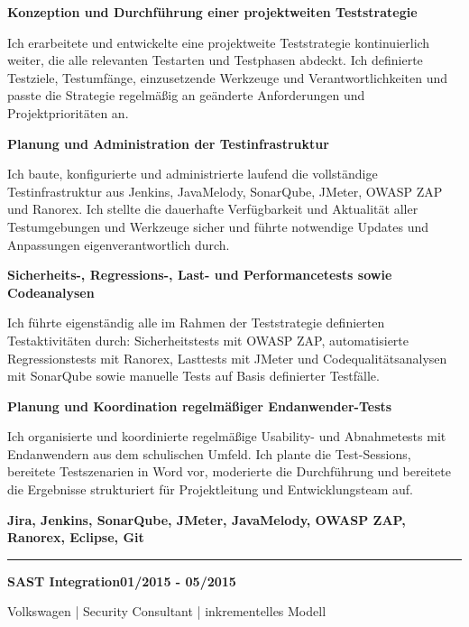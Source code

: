 \documentclass[9pt,a4paper]{article}
\newcommand{\phprojectname}[1]{{\fontsize{8.5}{9.2}\selectfont\bfseries #1}}
\newcommand{\phperiod}[1]{{\color{accent}\fontsize{6.5}{7}\selectfont\bfseries\MakeUppercase{#1}}}
\newcommand{\phprojectmeta}[1]{{\color{mutedfg}\fontsize{7}{8}\selectfont #1\par}}
\newcommand{\phresptitle}[1]{{\fontsize{7.5}{8.4}\selectfont\bfseries #1\par}}
\newcommand{\phrespdesc}[1]{{\color{mutedfg}\fontsize{7}{8.2}\selectfont #1\par}}
\newcommand{\phtoolline}[1]{{\color{accent}\fontsize{6.8}{7.6}\selectfont\bfseries #1\par}}
\begin{document}
\vspace{0.5mm}
\phresptitle{Konzeption und Durchführung einer projektweiten Teststrategie}
\phrespdesc{Ich erarbeitete und entwickelte eine projektweite Teststrategie kontinuierlich weiter, die alle relevanten Testarten und Testphasen abdeckt. Ich definierte Testziele, Testumfänge, einzusetzende Werkzeuge und Verantwortlichkeiten und passte die Strategie regelmäßig an geänderte Anforderungen und Projektprioritäten an.}
\vspace{0.8mm}
\phresptitle{Planung und Administration der Testinfrastruktur}
\phrespdesc{Ich baute, konfigurierte und administrierte laufend die vollständige Testinfrastruktur aus Jenkins, JavaMelody, SonarQube, JMeter, OWASP ZAP und Ranorex. Ich stellte die dauerhafte Verfügbarkeit und Aktualität aller Testumgebungen und Werkzeuge sicher und führte notwendige Updates und Anpassungen eigenverantwortlich durch.}
\vspace{0.8mm}
\phresptitle{Sicherheits-, Regressions-, Last- und Performancetests sowie Codeanalysen}
\phrespdesc{Ich führte eigenständig alle im Rahmen der Teststrategie definierten Testaktivitäten durch: Sicherheitstests mit OWASP ZAP, automatisierte Regressionstests mit Ranorex, Lasttests mit JMeter und Codequalitätsanalysen mit SonarQube sowie manuelle Tests auf Basis definierter Testfälle.}
\vspace{0.8mm}
\phresptitle{Planung und Koordination regelmäßiger Endanwender-Tests}
\phrespdesc{Ich organisierte und koordinierte regelmäßige Usability- und Abnahmetests mit Endanwendern aus dem schulischen Umfeld. Ich plante die Test-Sessions, bereitete Testszenarien in Word vor, moderierte die Durchführung und bereitete die Ergebnisse strukturiert für Projektleitung und Entwicklungsteam auf.}
\vspace{0.8mm}

\phtoolline{Jira, Jenkins, SonarQube, JMeter, JavaMelody, OWASP ZAP, Ranorex, Eclipse, Git}

\vspace{1.5mm}
{\color{rulefg}\rule{\linewidth}{0.25pt}\par}
\vspace{2.5mm}


\noindent
{\phprojectname{SAST Integration}\hfill\phperiod{01/2015 - 05/2015}\par}
{\phprojectmeta{Volkswagen | Security Consultant | inkrementelles Modell}%

\par}
\end{document}
